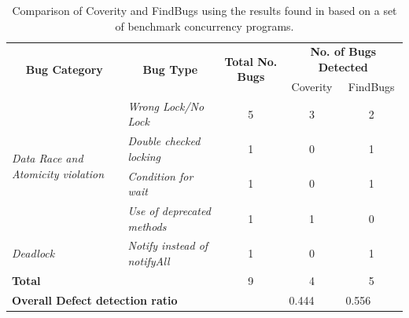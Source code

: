 \documentclass[10pt,oneside]{IEEEtran}
\begin{document}
\begin{table}[ht]
\centering
\caption{Comparison of Coverity and FindBugs using the results found in \cite{11} based on a set of benchmark concurrency programs.}
\label{tbl:concurrencyBugCompare}
\def\arraystretch{1.5}%
\begin{tabular}{|l|l|c|cc|}
\hline
\multicolumn{1}{|c|}{\multirow{2}{*}{{\bf Bug Category}}} & \multicolumn{1}{c|}{\multirow{2}{*}{{\bf Bug Type}}} & \multirow{2}{*}{{\bf Total No. Bugs}} & \multicolumn{2}{c|}{{\bf No. of Bugs Detected}}        \\ \cline{4-5}
\multicolumn{1}{|c|}{}                                    & \multicolumn{1}{c|}{}                                &                                       & Coverity                  & FindBugs                   \\ \hline
\multirow{4}{*}{{\it Data Race and Atomicity violation}}  & {\it Wrong Lock/No Lock}                             & 5                                     & 3                         & 2                          \\ \cline{2-5}
                                                          & {\it Double checked locking}                         & 1                                     & 0                         & 1                          \\ \cline{2-5}
                                                          & {\it Condition for wait}                             & 1                                     & 0                         & 1                          \\ \cline{2-5}
                                                          & {\it Use of deprecated methods}                      & 1                                     & 1                         & 0                          \\ \hline
{\it Deadlock}                                            & {\it Notify instead of notifyAll}                    & 1                                     & 0                         & 1                          \\ \hline
\multicolumn{2}{|l|}{{\bf Total}}                                                                                & 9                                     & 4                         & 5                          \\ \hline
\multicolumn{3}{|l|}{{\bf Overall Defect detection ratio}}                                                                                               & \multicolumn{1}{l}{0.444} & \multicolumn{1}{l|}{0.556} \\ \hline
\end{tabular}
\end{table}
\end{document}
